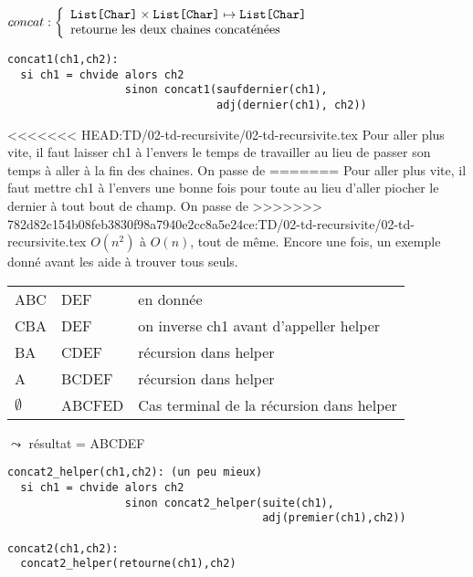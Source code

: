 \documentclass[10pt]{article}\usepackage[nu]{esial}
\begin{document}
\begin{Question}
  $concat: \left\{
    \begin{array}{l}
      \text{\texttt{List[Char]}}\times \text{\texttt{List[Char]}}\mapsto \text{\texttt{List[Char]}}\\
      \text{retourne les deux chaines concaténées}
    \end{array}\right.$  
\end{Question}
\begin{Reponse}
  \begin{Verbatim}[label=version brutale: $O(n^2)$]
concat1(ch1,ch2):
  si ch1 = chvide alors ch2
                  sinon concat1(saufdernier(ch1),
                                adj(dernier(ch1), ch2))
  \end{Verbatim}

<<<<<<< HEAD:TD/02-td-recursivite/02-td-recursivite.tex
  Pour aller plus vite, il faut laisser ch1 à l'envers le temps de travailler
  au lieu de passer son temps à aller à la fin des chaines. On passe de
=======
  Pour aller plus vite, il faut mettre ch1 à l'envers une bonne fois pour toute
  au lieu d'aller piocher le dernier à tout bout de champ. On passe de
>>>>>>> 782d82c154b08feb3830f98a7940e2cc8a5e24ce:TD/02-td-recursivite/02-td-recursivite.tex
  $O(n^2)$ à $O(n)$, tout de même. Encore une fois, un exemple donné avant les
  aide à trouver tous seuls.

  \begin{tabular}{|l l l|}\hline
    ABC&DEF& en donnée\\
    CBA&DEF& on inverse ch1 avant d'appeller helper\\
    BA&CDEF& récursion dans helper\\
    A&BCDEF& récursion dans helper\\
    $\emptyset$&ABCFED& Cas terminal de la récursion dans helper\\\hline
  \end{tabular}$\leadsto$ résultat = ABCDEF

  \begin{Verbatim}[label=version avec helper: $O(n)$]
concat2_helper(ch1,ch2): (un peu mieux)
  si ch1 = chvide alors ch2
                  sinon concat2_helper(suite(ch1),
                                       adj(premier(ch1),ch2))

concat2(ch1,ch2):
  concat2_helper(retourne(ch1),ch2)    
  \end{Verbatim}
\end{Reponse}
\end{document}
